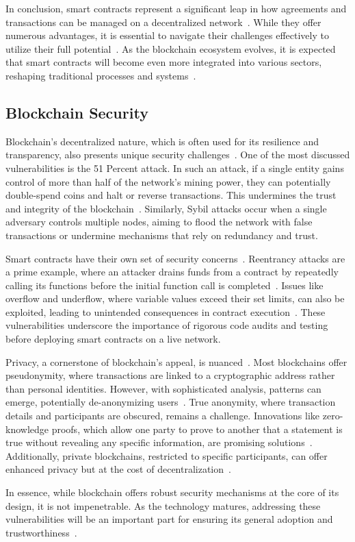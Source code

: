 In conclusion, smart contracts represent a significant leap in how agreements and transactions can be managed on a decentralized network~\cite{.2019}. While they offer numerous advantages, it is essential to navigate their challenges effectively to utilize their full potential~\cite{.2019}. As the blockchain ecosystem evolves, it is expected that smart contracts will become even more integrated into various sectors, reshaping traditional processes and systems~\cite{.2019}.

\subsection{Blockchain Security}
Blockchain's decentralized nature, which is often used for its resilience and transparency, also presents unique security challenges~\cite{Leng.2022}. One of the most discussed vulnerabilities is the 51 Percent attack. In such an attack, if a single entity gains control of more than half of the network's mining power, they can potentially double-spend coins and halt or reverse transactions. This undermines the trust and integrity of the blockchain~\cite{Singh.2021}. Similarly, Sybil attacks occur when a single adversary controls multiple nodes, aiming to flood the network with false transactions or undermine mechanisms that rely on redundancy and trust.

Smart contracts have their own set of security concerns~\cite{Alkhalifah.2021}. Reentrancy attacks are a prime example, where an attacker drains funds from a contract by repeatedly calling its functions before the initial function call is completed~\cite{Alkhalifah.2021}. Issues like overflow and underflow, where variable values exceed their set limits, can also be exploited, leading to unintended consequences in contract execution~\cite{Guo.2022}. These vulnerabilities underscore the importance of rigorous code audits and testing before deploying smart contracts on a live network.

Privacy, a cornerstone of blockchain's appeal, is nuanced~\cite{Kus.2022}. Most blockchains offer pseudonymity, where transactions are linked to a cryptographic address rather than personal identities. However, with sophisticated analysis, patterns can emerge, potentially de-anonymizing users~\cite{Kus.2022}. True anonymity, where transaction details and participants are obscured, remains a challenge. Innovations like zero-knowledge proofs, which allow one party to prove to another that a statement is true without revealing any specific information, are promising solutions~\cite{Deng.2021}. Additionally, private blockchains, restricted to specific participants, can offer enhanced privacy but at the cost of decentralization~\cite{Deng.2021}.

In essence, while blockchain offers robust security mechanisms at the core of its design, it is not impenetrable. As the technology matures, addressing these vulnerabilities will be an important part for ensuring its general adoption and trustworthiness~\cite{Singh.2021}.
